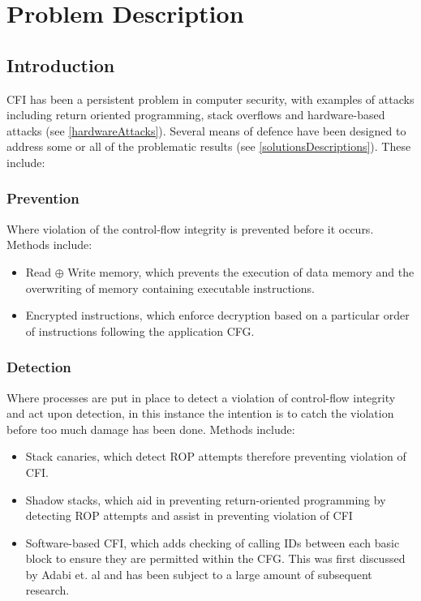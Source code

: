 \section{Problem Description}
\subsection{Introduction}

CFI has been a persistent problem in computer security, with examples of attacks including return oriented programming, stack overflows and hardware-based attacks (see \ref{hardwareAttacks}). Several means of defence have been designed to address some or all of the problematic results (see \ref{solutionsDescriptions}). These include:

\subsubsection*{Prevention}
Where violation of the control-flow integrity is prevented before it occurs. Methods include:
\begin{itemize}
	\item Read $\oplus$ Write memory, which prevents the execution of data memory and the overwriting of memory containing executable instructions.
	\item Encrypted instructions, which enforce decryption based on a particular order of instructions following the application CFG.
\end{itemize}

\subsubsection*{Detection}
Where processes are put in place to detect a violation of control-flow integrity and act upon detection, in this instance the intention is to catch the violation before too much damage has been done. Methods include:
\begin{itemize}
	\item Stack canaries, which detect ROP attempts therefore preventing violation of CFI.
	\item Shadow stacks, which aid in preventing return-oriented programming by detecting ROP attempts and assist in preventing violation of CFI
	\item Software-based CFI, which adds checking of calling IDs between each basic block to ensure they are permitted within the CFG. This was first discussed by Adabi et. al \cite{Abadi2005} and has been subject to a large amount of subsequent research.
\end{itemize}

